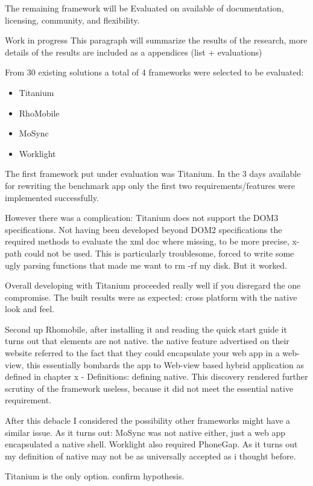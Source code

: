 The remaining framework will be Evaluated on available of documentation, licensing, community, and flexibility.

Work in progress
This paragraph will summarize the results of the research, more details of the results are included as a appendices (list + evaluations) %

From 30 existing solutions a total of 4 frameworks were selected to be evaluated:
\begin{itemize}
	\item Titanium
	\item RhoMobile
	\item MoSync
	\item Worklight
\end{itemize} 

The first framework put under evaluation was Titanium. In the 3 days available for rewriting the benchmark app only the first two requirements/features were implemented successfully.

However there was a complication: Titanium does not support the DOM3 specifications. Not having been developed beyond DOM2 specifications the required methods to evaluate the xml doc where missing, to be more precise, x-path could not be used. This is particularly troublesome, forced to write some ugly parsing functions that made me want to rm -rf my disk. But it worked. %

Overall developing with Titanium proceeded really well if you disregard the one compromise. The built results were as expected: cross platform with the native look and feel.

Second up Rhomobile, after installing it and reading the quick start guide it turns out that elements are not native. the native feature advertised on their website referred to the fact that they could encapsulate your web app in a web-view, this essentially bombards the app to Web-view based hybrid application as defined in chapter x - Definitions: defining native. This discovery rendered further scrutiny of the framework useless, because it did not meet the essential native requirement.

After this debacle I considered the possibility other frameworks might have a similar issue. As it turns out: MoSync was not native either, just a web app encapsulated a native shell. Worklight also required PhoneGap. As it turns out my definition of native may not be as universally accepted as i thought before.







Titanium is the only option.
confirm hypothesis.

